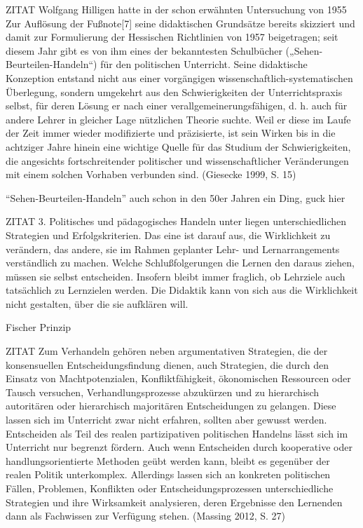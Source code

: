 ZITAT
Wolfgang Hilligen hatte in der schon erwähnten Untersuchung von 1955 Zur Auflösung der Fußnote[7] seine didaktischen Grundsätze bereits skizziert und damit zur Formulierung der Hessischen Richtlinien von 1957 beigetragen; seit diesem Jahr gibt es von ihm eines der bekanntesten Schulbücher („Sehen-Beurteilen-Handeln“) für den politischen Unterricht. Seine didaktische Konzeption entstand nicht aus einer vorgängigen wissenschaftlich-systematischen Überlegung, sondern umgekehrt aus den Schwierigkeiten der Unterrichtspraxis selbst, für deren Lösung er nach einer verallgemeinerungsfähigen, d. h. auch für andere Lehrer in gleicher Lage nützlichen Theorie suchte. Weil er diese im Laufe der Zeit immer wieder modifizierte und präzisierte, ist sein Wirken bis in die achtziger Jahre hinein eine wichtige Quelle für das Studium der Schwierigkeiten, die angesichts fortschreitender politischer und wissenschaftlicher Veränderungen mit einem solchen Vorhaben verbunden sind.  (Giesecke 1999, S. 15)

\enquote{Sehen-Beurteilen-Handeln} auch schon in den 50er Jahren ein Ding, guck hier \autocite[15]{Giesecke.1999}

ZITAT
3. Politisches und pädagogisches Handeln unter liegen unterschiedlichen Strategien und Erfolgskriterien. Das eine ist darauf aus, die Wirklichkeit zu verändern, das andere, sie im Rahmen geplanter Lehr- und Lernarrangements verständlich zu machen. Welche Schlußfolgerungen die Lernen den daraus ziehen, müssen sie selbst entscheiden. Insofern bleibt immer fraglich, ob Lehrziele auch tatsächlich zu Lernzielen werden. Die Didaktik kann von sich aus die Wirklichkeit nicht gestalten, über die sie aufklären will. \autocite[22]{Giesecke.1999}


Fischer Prinzip \autocite[]{Grammes.2005}

ZITAT
 Zum Verhandeln gehören neben argumentativen Strategien, die der konsensuellen Entscheidungsfindung dienen, auch Strategien, die durch den Einsatz von Machtpotenzialen, Konfliktfähigkeit, ökonomischen Ressourcen oder Tausch versuchen, Verhandlungsprozesse abzukürzen und zu hierarchisch autoritären oder hierarchisch majoritären Entscheidungen zu gelangen. Diese lassen sich im Unterricht zwar nicht erfahren, sollten aber gewusst werden. Entscheiden als Teil des realen partizipativen politischen Handelns lässt sich im Unterricht nur begrenzt fördern. Auch wenn Entscheiden durch kooperative oder handlungsorientierte Methoden geübt werden kann, bleibt es gegenüber der realen Politik unterkomplex. Allerdings lassen sich an konkreten politischen Fällen, Problemen, Konflikten oder Entscheidungsprozessen unterschiedliche Strategien und ihre Wirksamkeit analysieren, deren Ergebnisse den Lernenden dann als Fachwissen zur Verfügung stehen. (Massing 2012, S. 27)

